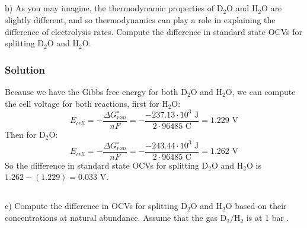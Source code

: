 \documentclass[12pt]{article}
\begin{document}
\subsection{}
b) As you may imagine, the thermodynamic properties of $\mathrm{D}_{2} \mathrm{O}$ and $\mathrm{H}_{2} \mathrm{O}$ are slightly different, and so thermodynamics can play a role in explaining the difference of electrolysis rates. Compute the difference in standard state OCVs for splitting $\mathrm{D}_{2} \mathrm{O}$ and $\mathrm{H}_{2} \mathrm{O}$.\\
\subsubsection{Solution}
Because we have the Gibbs free energy for both $\mathrm{D}_{2} \mathrm{O}$ and $\mathrm{H}_{2} \mathrm{O}$, we can compute the cell voltage for both reactions, first for $\mathrm{H}_{2} \mathrm{O}$:
\begin{equation}
E_{cell} = -\frac{\Delta G_{rxn}^{\circ}}{nF} = -\frac{-237.13 \cdot 10^{3} \text{ J}}{2 \cdot 96485 \text{ C}} = 1.229 \text{ V}
\end{equation}
Then for $\mathrm{D}_{2} \mathrm{O}$:
\begin{equation}
E_{cell} = -\frac{\Delta G_{rxn}^{\circ}}{nF} = -\frac{-243.44 \cdot 10^{3} \text{ J}}{2 \cdot 96485 \text{ C}} = 1.262 \text{ V}
\end{equation}
So the difference in standard state OCVs for splitting $\mathrm{D}_{2} \mathrm{O}$ and $\mathrm{H}_{2} \mathrm{O}$ is $1.262 - (1.229) = 0.033 \text{ V}$.
\subsection{}
c) Compute the difference in OCVs for splitting $\mathrm{D}_{2} \mathrm{O}$ and $\mathrm{H}_{2} \mathrm{O}$ based on their concentrations at natural abundance. Assume that the gas $\mathrm{D}_{2} / \mathrm{H}_{2}$ is at 1 bar .
\end{document}
